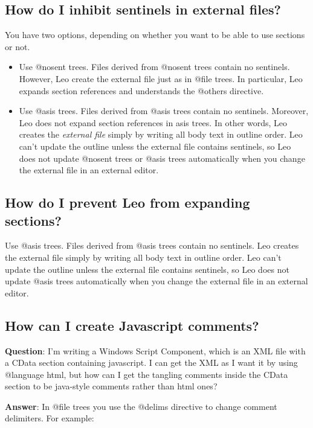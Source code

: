 \documentclass[a4paper,10pt,english]{sphinxmanual}
\begin{document}
\subsection{How do I inhibit sentinels in external files?}
\label{FAQ:how-do-i-inhibit-sentinels-in-external-files}
You have two options, depending on whether you want to be able to use sections
or not.
\begin{itemize}
\item {} 
Use @nosent trees.
Files derived from @nosent trees contain no sentinels.
However, Leo create the external file just as in @file trees.
In particular, Leo expands section references and understands the @others directive.

\item {} 
Use @asis trees.
Files derived from @asis trees contain no sentinels.
Moreover, Leo does not expand section references in asis trees.
In other words, Leo creates the \emph{external file} simply by writing all body text in outline order.
Leo can't update the outline unless the external file contains sentinels,
so Leo does not update @nosent trees or @asis trees automatically when
you change the external file in an external editor.

\end{itemize}


\subsection{How do I prevent Leo from expanding sections?}
\label{FAQ:how-do-i-prevent-leo-from-expanding-sections}
Use @asis trees. Files derived from @asis trees contain no sentinels. Leo
creates the external file simply by writing all body text in outline order. Leo
can't update the outline unless the external file contains sentinels, so Leo
does not update @asis trees automatically when you change the external file in
an external editor.


\subsection{How can I create Javascript comments?}
\label{FAQ:how-can-i-create-javascript-comments}
\textbf{Question}: I'm writing a Windows Script Component, which is an XML file with
a CData section containing javascript. I can get the XML as I want it by using
@language html, but how can I get the tangling comments inside the CData
section to be java-style comments rather than html ones?

\textbf{Answer}: In @file trees you use the @delims directive to change comment delimiters.
For example:
\end{document}
